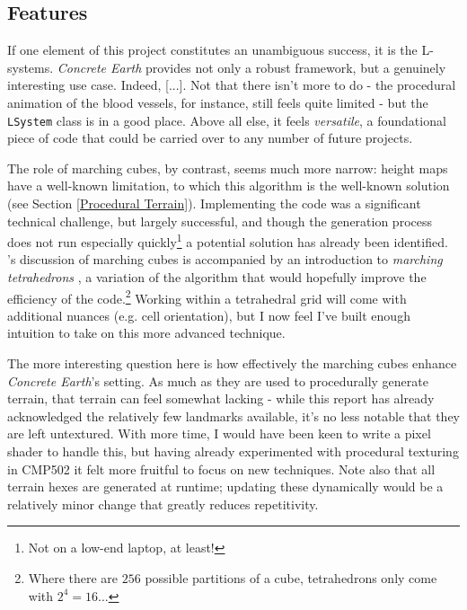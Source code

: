\documentclass[a4paper, 11pt]{article}
\begin{document}
\begin{flushleft}
\subsection{Features}

If one element of this project constitutes an unambiguous success, it is the L-systems. \textit{Concrete Earth} provides not only a robust framework, but a genuinely interesting use case. Indeed, [...]. Not that there isn't more to do - the procedural animation of the blood vessels, for instance, still feels quite limited - but the \texttt{LSystem} class is in a good place. Above all else, it feels \textit{versatile}, a foundational piece of code that could be carried over to any number of future projects.

\vspace{5pt}\noindent
The role of marching cubes, by contrast, seems much more narrow: height maps have a well-known limitation, to which this algorithm is the well-known solution (see Section \ref{Procedural Terrain}). Implementing the code was a significant technical challenge, but largely successful, and though the generation process does not run especially quickly\footnote{Not on a low-end laptop, at least!} a potential solution has already been identified. \citeauthor{bourkeMarchingTetrahedrons}'s discussion of marching cubes is accompanied by an introduction to \textit{marching tetrahedrons} \citeyearpar{bourkeMarchingTetrahedrons}, a variation of the algorithm that would hopefully improve the efficiency of the code.\footnote{Where there are $256$ possible partitions of a cube, tetrahedrons only come with $2^4 = 16$...} Working within a tetrahedral grid will come with additional nuances (e.g. cell orientation), but I now feel I've built enough intuition to take on this more advanced technique. %

\vspace{5pt}\noindent
The more interesting question here is how effectively the marching cubes enhance \textit{Concrete Earth}'s setting. As much as they are used to procedurally generate terrain, that terrain can feel somewhat lacking - while this report has already acknowledged the relatively few landmarks available, it's no less notable that they are left untextured. With more time, I would have been keen to write a pixel shader to handle this, but having already experimented with procedural texturing in CMP502 it felt more fruitful to focus on new techniques. Note also that all terrain hexes are generated at runtime; updating these dynamically would be a relatively minor change that greatly reduces repetitivity.


\end{flushleft}
\end{document}
